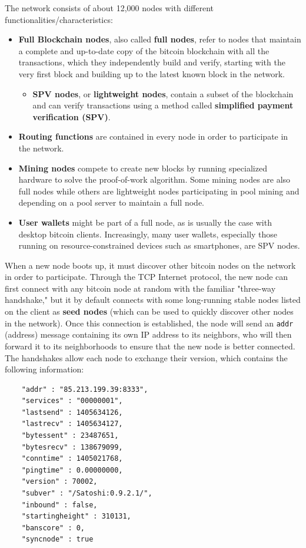 \documentclass{article}
\begin{document}
    The network consists of about 12,000 nodes with different functionalities/characteristics:
    \begin{itemize}
      \item \textbf{Full Blockchain nodes}, also called \textbf{full nodes}, refer to nodes that maintain a complete and up-to-date copy of the bitcoin blockchain with all the transactions, which they independently build and verify, starting with the very first block and building up to the latest known block in the network.
      \begin{itemize}
        \item \textbf{SPV nodes}, or \textbf{lightweight nodes}, contain a subset of the blockchain and can verify transactions using a method called \textbf{simplified payment verification (SPV)}.
      \end{itemize}
      \item \textbf{Routing functions} are contained in every node in order to participate in the network.
      \item \textbf{Mining nodes} compete to create new blocks by running specialized hardware to solve the proof-of-work algorithm. Some mining nodes are also full nodes while others are lightweight nodes participating in pool mining and depending on a pool server to maintain a full node.
      \item \textbf{User wallets} might be part of a full node, as is usually the case with desktop bitcoin clients. Increasingly, many user wallets, especially those running on resource-constrained devices such as smartphones, are SPV nodes.
    \end{itemize}

    When a new node boots up, it must discover other bitcoin nodes on the network in order to participate. Through the TCP Internet protocol, the new node can first connect with any bitcoin node at random with the familiar "three-way handshake," but it by default connects with some long-running stable nodes listed on the client as \textbf{seed nodes} (which can be used to quickly discover other nodes in the network). Once this connection is established, the node will send an \texttt{addr} (address) message containing its own IP address to its neighbors, who will then forward it to its neighborhoods to ensure that the new node is better connected. The handshakes allow each node to exchange their version, which contains the following information:

    \begin{lstlisting}
    "addr" : "85.213.199.39:8333",
    "services" : "00000001",
    "lastsend" : 1405634126,
    "lastrecv" : 1405634127,
    "bytessent" : 23487651,
    "bytesrecv" : 138679099,
    "conntime" : 1405021768,
    "pingtime" : 0.00000000,
    "version" : 70002,
    "subver" : "/Satoshi:0.9.2.1/",
    "inbound" : false,
    "startingheight" : 310131,
    "banscore" : 0,
    "syncnode" : true
    \end{lstlisting}
\end{document}
